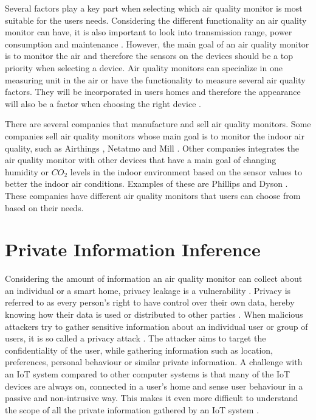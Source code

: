 Several factors play a key part when selecting which air quality monitor is most suitable for the users needs. Considering the different functionality an air quality monitor can have, it is also important to look into transmission range, power consumption and maintenance \cite{AQMBigSource}. However, the main goal of an air quality monitor is to monitor the air and therefore the sensors on the devices should be a top priority when selecting a device. Air quality monitors can specialize in one measuring unit in the air or have the functionality to measure several air quality factors. They will be incorporated in users homes and therefore the appearance will also be a factor when choosing the right device \cite{IAQMonitorCommunicationReview}. 

There are several companies that manufacture and sell air quality monitors. Some companies sell air quality monitors whose main goal is to monitor the indoor air quality, such as Airthings \cite{Airthings}, Netatmo \cite{Netatmo} and Mill \cite{Mill}. Other companies integrates the air quality monitor with other devices that have a main goal of changing humidity or \(CO_2\) levels in the indoor environment based on the sensor values to better the indoor air conditions. Examples of these are Phillips \cite{Philips} and Dyson \cite{Dyson}. These companies have different air quality monitors that users can choose from based on their needs. 

\section{Private Information Inference}
Considering the amount of information an air quality monitor can collect about an individual or a smart home, privacy leakage is a vulnerability \cite{SecPrivSmartCity}. Privacy is referred to as every person's right to have control over their own data, hereby knowing how their data is used or distributed to other parties \cite{IoTSecPrivSafeEth}. When malicious attackers try to gather sensitive information about an individual user or group of users, it is so called a privacy attack \cite{CyberEntitySecInIoT}. The attacker aims to target the confidentiality of the user, while gathering information such as location, preferences, personal behaviour or similar private information. A challenge with an \gls{IoT} system compared to other computer systems is that many of the \gls{IoT} devices are always on, connected in a user's home and sense user behaviour in a passive and non-intrusive way. This makes it even more difficult to understand the scope of all the private information gathered by an \gls{IoT} system \cite{IoTSecPrivSafeEth}.

